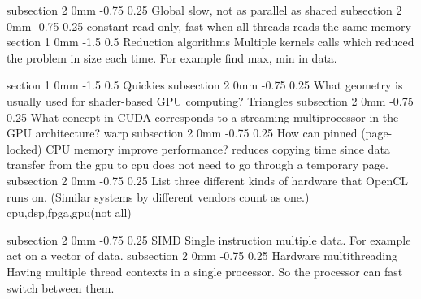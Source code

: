\documentclass[a4paper,11pt]{article}
\makeatletter
\renewcommand{\section}{\@startsection
   {section}%
   {1}%
   {0mm}%
   {-1.5\baselineskip}%
   {0.5\baselineskip}%
   {\sffamily\bfseries\upshape\normalsize}}%
\renewcommand{\subsection}{\@startsection
   {subsection}%
   {2}%
   {0mm}%
   {-0.75\baselineskip}%
   {0.25\baselineskip}%
   {\rmfamily\normalfont\slshape\normalsize}}%
\makeatother
\begin{document}
\subsection{Global}
slow, not as parallel as shared
\subsection{constant}
read only, fast when all threads reads the same memory
\section{Reduction algorithms}
Multiple kernels calls which reduced the problem in size each time. For example find max, min in data.

\section{Quickies}
\subsection{What geometry is usually used for shader-based GPU computing?}
Triangles
\subsection{What concept in CUDA corresponds to a streaming multiprocessor in the GPU
architecture?}
warp
\subsection{How can pinned (page-locked) CPU memory improve performance?}
reduces copying time since data transfer from the gpu to cpu does not need to go through a temporary page.
\subsection{List three different kinds of hardware that OpenCL runs on. (Similar systems by
different vendors count as one.)}
cpu,dsp,fpga,gpu(not all)

\subsection{SIMD}
Single instruction multiple data. For example act on a vector of data. 
\subsection{Hardware multithreading}
Having multiple thread contexts in a single processor. So the processor can fast switch between them.
\end{document}
